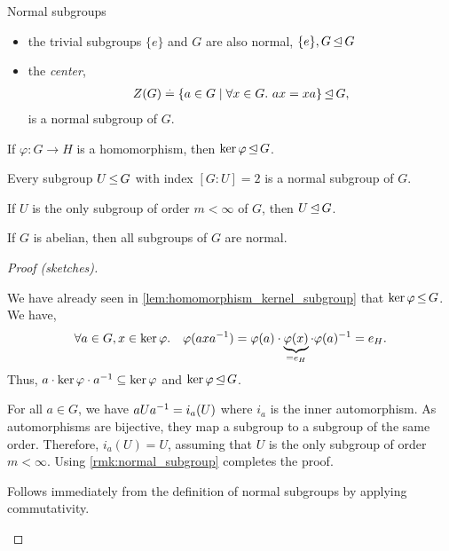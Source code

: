 \begin{ex}{Normal subgroups}{}
\begin{itemize}
    \item the trivial subgroups $\{e\}$ and $G$ are also normal, $\{e\}, G \operatorname*{\trianglelefteq} G$
    \item the \emph{center}, \begin{align}
        Z(G) \overset{.}{=} \{a \in G \mid \forall x \in G.\ ax = xa\} \operatorname*{\trianglelefteq} G,
    \end{align} is a normal subgroup of $G$.
\end{itemize}
\end{ex}

\begin{lem}
\leavevmode\begin{lemlist}
    \item If $\varphi : G \to H$ is a homomorphism, then $\ker{\varphi} \operatorname*{\trianglelefteq} G$.
    \item Every subgroup $U \operatorname*{\leq} G$ with index $[G:U] = 2$ is a normal subgroup of $G$.
    \item\label{lem:normal_subgroup_c} If $U$ is the only subgroup of order $m < \infty$ of $G$, then $U \operatorname*{\trianglelefteq} G$.
    \item If $G$ is abelian, then all subgroups of $G$ are normal.
\end{lemlist}
\end{lem} \begin{proof}[Proof (sketches)]
\leavevmode\begin{lemlist}
    \item We have already seen in \cref{lem:homomorphism_kernel_subgroup} that $\ker{\varphi} \operatorname*{\leq} G$. We have, \begin{align*}
        \forall a \in G, x \in \ker{\varphi}.\quad \varphi(a x a^{-1}) = \varphi(a) \cdot \underbrace{\varphi(x)}_{= e_H} \cdot \varphi(a)^{-1} = e_H.
    \end{align*} Thus, $a \cdot \ker{\varphi} \cdot a^{-1} \subseteq \ker{\varphi}$ and $\ker{\varphi} \operatorname*{\trianglelefteq} G$.
    
    \addtocounter{lemlisti}{1}\item For all $a \in G$, we have $a U a^{-1} = i_a(U)$ where $i_a$ is the inner automorphism. As automorphisms are bijective, they map a subgroup to a subgroup of the same order. Therefore, ${i_a(U) = U}$, assuming that $U$ is the only subgroup of order $m < \infty$. Using \cref{rmk:normal_subgroup} completes the proof.
    
    \item Follows immediately from the definition of normal subgroups by applying commutativity. \qedhere
\end{lemlist}
\end{proof}

